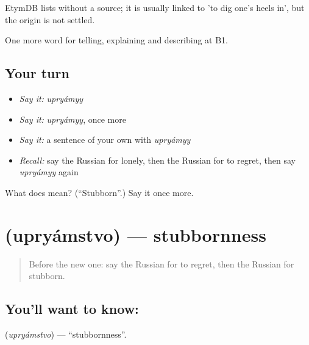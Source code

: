 \begin{cousinweb}
EtymDB lists \emph{} without a source; it is usually linked to \emph{} 'to dig one's heels in', but the origin is not settled.
\end{cousinweb}

\begin{grammarlens}[title={What you've built}]
One more word for telling, explaining and describing at B1.
\end{grammarlens}

\subsection*{Your turn}
\begin{itemize}
\raggedright
  \item \emph{Say it:} \emph{upryámyy}
  \item \emph{Say it:} \emph{upryámyy}, once more
  \item \emph{Say it:} a sentence of your own with \emph{upryámyy}
  \item \emph{Recall:} say the Russian for lonely, then the Russian for to regret, then say \emph{upryámyy} again
\end{itemize}

\begin{tcolorbox}[breakable,colback=teal!4,colframe=teal!35!black,title={Before you move on}]
What does  mean? (\textquotedblleft{}Stubborn\textquotedblright{}.) Say it once more.
\end{tcolorbox}
\section[\texorpdfstring{\ru{упрямство} (upryámstvo)}{упрямство (upryámstvo)}]{ (upryámstvo) — stubbornness}

\label{lesson:RU-C478-upryamstvo}



\begin{quote}
Before the new one: say the Russian for to regret, then the Russian for stubborn.
\end{quote}

\subsection*{You'll want to know: }
\textbf{} (\emph{upryámstvo}) — \textquotedblleft{}stubbornness\textquotedblright{}.

